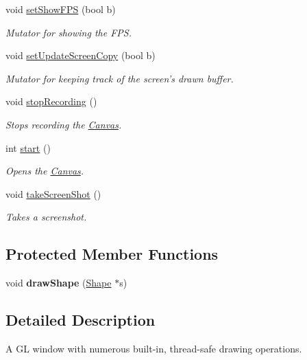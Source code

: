 \begin{DoxyCompactItemize}
void \hyperlink{class_canvas_abb5ef4023451ce81f81112641384e80c}{set\+Show\+F\+P\+S} (bool b)
\begin{DoxyCompactList}\small\item\em Mutator for showing the F\+P\+S. \end{DoxyCompactList}\item 
void \hyperlink{class_canvas_a0a7d72a13049a5af280f2cbc6c49c08d}{set\+Update\+Screen\+Copy} (bool b)
\begin{DoxyCompactList}\small\item\em Mutator for keeping track of the screen's drawn buffer. \end{DoxyCompactList}\item 
void \hyperlink{class_canvas_a6503d6e8efc953a492f04895f5131dff}{stop\+Recording} ()
\begin{DoxyCompactList}\small\item\em Stops recording the \hyperlink{class_canvas}{Canvas}. \end{DoxyCompactList}\item 
int \hyperlink{class_canvas_acb0e91ff615b90fee442ccd43d003a42}{start} ()
\begin{DoxyCompactList}\small\item\em Opens the \hyperlink{class_canvas}{Canvas}. \end{DoxyCompactList}\item 
void \hyperlink{class_canvas_a82f53634a21ab8bf7daf6586ad4c313f}{take\+Screen\+Shot} ()
\begin{DoxyCompactList}\small\item\em Takes a screenshot. \end{DoxyCompactList}\end{DoxyCompactItemize}
\subsection*{Protected Member Functions}
\begin{DoxyCompactItemize}
\item 
\hypertarget{class_canvas_a0165ea279b0438ed67832af40026e21a}{void {\bfseries draw\+Shape} (\hyperlink{class_shape}{Shape} $\ast$s)}\label{class_canvas_a0165ea279b0438ed67832af40026e21a}

\end{DoxyCompactItemize}


\subsection{Detailed Description}
A G\+L window with numerous built-\/in, thread-\/safe drawing operations. 


